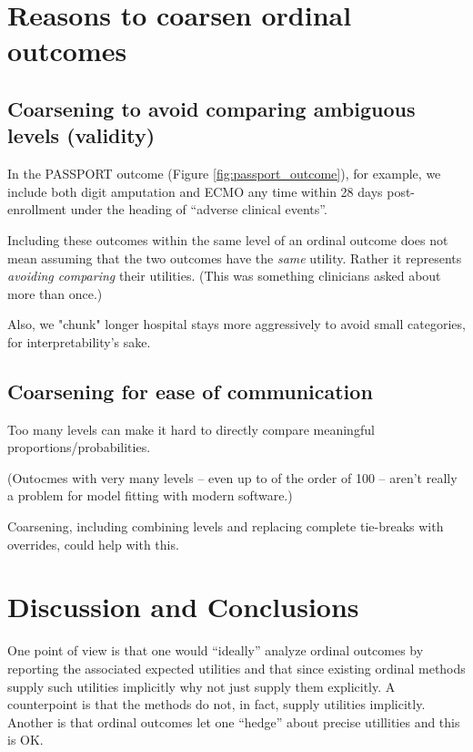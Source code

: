 \documentclass[
  11pt,
  fleqn
]{article}
\begin{document}
\section{Reasons to coarsen ordinal outcomes}

\subsection{Coarsening to avoid comparing ambiguous levels (validity)}

In the PASSPORT outcome (Figure \ref{fig:passport_outcome}), for
example, we include both digit
amputation and ECMO
any time within 28 days post-enrollment under the heading of
``adverse clinical events''.

Including these outcomes within the same level of an
ordinal outcome does not mean assuming that the two outcomes have the
\emph{same} utility. Rather it represents \emph{avoiding comparing}
their utilities. (This was something clinicians asked about more than once.)

Also, we "chunk" longer hospital stays more aggressively to avoid
small categories, for interpretability's sake.

\subsection{Coarsening for ease of communication}

Too many levels can make it hard to directly compare meaningful
proportions/probabilities.

(Outocmes with very many levels -- even up to of the order of 100 --
aren't really a problem for model fitting with modern software.)

Coarsening, including combining levels and replacing complete
tie-breaks with overrides, could help with this.

\section{Discussion and Conclusions}

One point of view is that one would ``ideally'' analyze ordinal outcomes by
reporting the associated expected utilities  and that since existing ordinal
methods supply
such utilities implicitly why not just supply them explicitly. A
counterpoint
is that the methods do not, in fact, supply utilities implicitly.
Another is that ordinal outcomes let one ``hedge'' about precise
utillities and this is OK.

\newpage

\printbibliography
\end{document}
